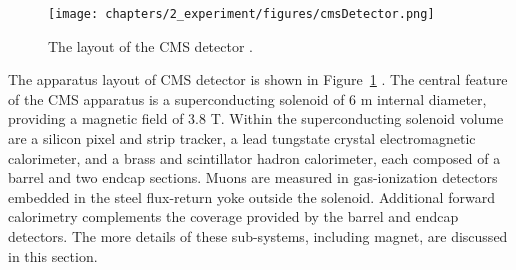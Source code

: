 \begin{figure}
    \centering
    \texttt{[image: chapters/2\_experiment/figures/cmsDetector.png]}
    \caption{The layout of the CMS detector \cite{cms:detectorOverview}.}
    \label{fig:exp:detectorOverview}
\end{figure}

The apparatus layout of CMS detector is shown in Figure~\ref{fig:exp:detectorOverview} \cite{cms:detectorOverview}. The central feature of the CMS apparatus is a superconducting solenoid of 6 m internal diameter, providing a magnetic field of 3.8 T. Within the superconducting solenoid volume are a silicon pixel and strip tracker, a lead tungstate crystal electromagnetic calorimeter, and a brass and scintillator hadron calorimeter, each composed of a barrel and two endcap sections. Muons are measured in gas-ionization detectors embedded in the steel flux-return yoke outside the solenoid. Additional forward calorimetry complements the coverage provided by the barrel and endcap detectors. The more details of these sub-systems, including magnet,  are discussed in this section. 





